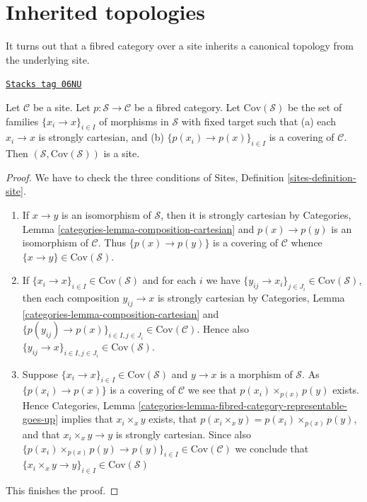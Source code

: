 \section{Inherited topologies}
\label{stacks-section-topology}
It turns out that a fibred category over a site inherits a canonical
topology from the underlying site.

\begin{lemma}
\label{stacks-lemma-topology-inherited}
\href{https://stacks.math.columbia.edu/tag/06NU}{\texttt{Stacks tag 06NU}}

Let $\mathcal{C}$ be a site. Let $p : \mathcal{S} \to \mathcal{C}$
be a fibred category. Let $\text{Cov}(\mathcal{S})$
be the set of families $\{x_i \to x\}_{i \in I}$ of morphisms in $\mathcal{S}$
with fixed target such that (a) each $x_i \to x$ is strongly cartesian,
and (b) $\{p(x_i) \to p(x)\}_{i \in I}$ is a covering of $\mathcal{C}$.
Then $(\mathcal{S}, \text{Cov}(\mathcal{S}))$ is a site.
\end{lemma}

\begin{proof}
We have to check the three conditions of
Sites, Definition \ref{sites-definition-site}.
\begin{enumerate}
\item If $x \to y$ is an isomorphism of $\mathcal{S}$, then
it is strongly cartesian by
Categories, Lemma \ref{categories-lemma-composition-cartesian}
and $p(x) \to p(y)$ is an isomorphism of $\mathcal{C}$. Thus
$\{p(x) \to p(y)\}$ is a covering of $\mathcal{C}$ whence
$\{x \to y\} \in \text{Cov}(\mathcal{S})$.
\item If $\{x_i \to x\}_{i\in I} \in \text{Cov}(\mathcal{S})$ and for each
$i$ we have $\{y_{ij} \to x_i\}_{j\in J_i} \in \text{Cov}(\mathcal{S})$, then
each composition $y_{ij} \to x$ is strongly cartesian by
Categories, Lemma \ref{categories-lemma-composition-cartesian}
and $\{p(y_{ij}) \to p(x)\}_{i \in I, j\in J_i} \in \text{Cov}(\mathcal{C})$.
Hence also $\{y_{ij} \to x\}_{i \in I, j\in J_i} \in \text{Cov}(\mathcal{S})$.
\item Suppose $\{x_i \to x\}_{i\in I}\in \text{Cov}(\mathcal{S})$
and $y \to x$ is a morphism of $\mathcal{S}$. As $\{p(x_i) \to p(x)\}$
is a covering of $\mathcal{C}$ we see that $p(x_i) \times_{p(x)} p(y)$
exists. Hence
Categories, Lemma \ref{categories-lemma-fibred-category-representable-goes-up}
implies that $x_i \times_x y$ exists, that $p(x_i \times_x y) =
p(x_i) \times_{p(x)} p(y)$, and that $x_i \times_x y \to y$ is
strongly cartesian. Since also
$\{p(x_i) \times_{p(x)} p(y) \to p(y) \}_{i\in I} \in \text{Cov}(\mathcal{C})$
we conclude that
$\{x_i \times_x y \to y \}_{i\in I} \in \text{Cov}(\mathcal{S})$
\end{enumerate}
This finishes the proof.
\end{proof}


